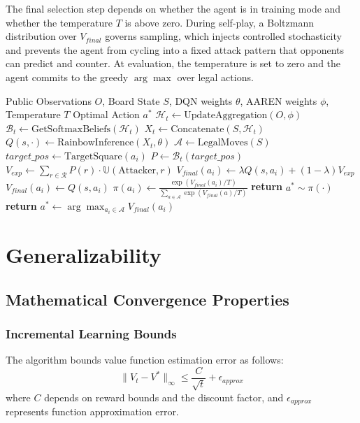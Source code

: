 The final selection step depends on whether the agent is in training mode and whether the temperature $T$ is above zero. During self-play, a Boltzmann distribution over $V_{final}$ governs sampling, which injects controlled stochasticity and prevents the agent from cycling into a fixed attack pattern that opponents can predict and counter. At evaluation, the temperature is set to zero and the agent commits to the greedy $\arg\max$ over legal actions.

\begin{algorithm}
\caption{MARQ: Decision-making and Move Selection}
\begin{algorithmic}[1]
\REQUIRE Public Observations $O$, Board State $S$, DQN weights $\theta$, AAREN weights $\phi$, Temperature $T$
\ENSURE Optimal Action $a^*$
\STATE $\mathcal{H}_t \gets \text{UpdateAggregation}(O, \phi)$ 
\STATE $\mathcal{B}_t \gets \text{GetSoftmaxBeliefs}(\mathcal{H}_t)$ 
\STATE $X_t \gets \text{Concatenate}(S, \mathcal{H}_t)$ 
\STATE $Q(s, \cdot) \gets \text{RainbowInference}(X_t, \theta)$ 
\STATE $\mathcal{A} \gets \text{LegalMoves}(S)$
        \STATE $target\_pos \gets \text{TargetSquare}(a_i)$
        \STATE $P \gets \mathcal{B}_t(target\_pos)$ 
        \STATE $V_{exp} \gets \sum_{r \in \mathcal{R}} P(r) \cdot \mathbb{U}(\text{Attacker}, r)$ 
        \STATE $V_{final}(a_i) \gets \lambda Q(s, a_i) + (1-\lambda) V_{exp}$
    \ELSE
        \STATE $V_{final}(a_i) \gets Q(s, a_i)$
    \ENDIF
\ENDFOR
{}
    \STATE $\pi(a_i) \gets \frac{\exp(V_{final}(a_i) / T)}{\sum_{a \in \mathcal{A}} \exp(V_{final}(a) / T)}$
    \STATE \textbf{return} $a^* \sim \pi(\cdot)$
\ELSE
    \STATE \textbf{return} $a^* \gets \arg\max_{a_i \in \mathcal{A}} V_{final}(a_i)$
\ENDIF
\end{algorithmic}
\label{alg:marq_decision}
\end{algorithm}



\section{Generalizability}

\subsection{Mathematical Convergence Properties}
\subsubsection{Incremental Learning Bounds}
The algorithm bounds value function estimation error as follows:
\begin{equation}
\|V_t - V^*\|_\infty \leq \frac{C}{\sqrt{t}} + \epsilon_{approx}
\end{equation}
where $C$ depends on reward bounds and the discount factor, and $\epsilon_{approx}$ represents function approximation error.

